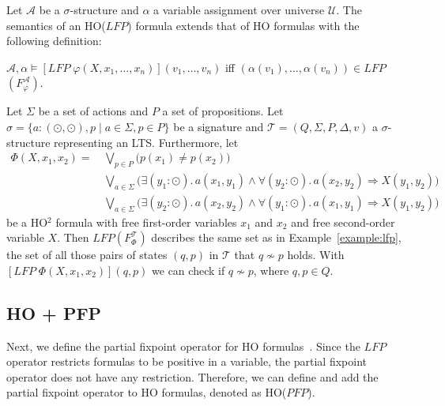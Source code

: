 \begin{definition}
    Let $\mathcal{A}$ be a $\sigma$-structure and $\alpha$ a variable assignment over universe $\mathcal{U}$. The
    semantics of an HO($\mathit{LFP}$) formula extends that of HO formulas with the following definition:
    \begin{compactitem}
        \item $\mathcal{A}, \alpha \models [\mathit{LFP}\;\varphi(X, x_1, \dots, x_n)](v_1, \dots,
        v_n)$ iff $(\alpha(v_1), \dots, \alpha(v_n)) \in \mathit{LFP}$ $(F_\varphi^\mathcal{A})$.
    \end{compactitem}
\end{definition}

\begin{example}
    \label{example:ho_lfp} 
    Let $\Sigma$ be a set of actions and $P$ a set of propositions. Let $\sigma = \{a: (\odot, \odot), p \mid a \in \Sigma, p \in P\}$ be a signature and $\mathcal{T} = (Q, \Sigma, P, \Delta, v)$ a $\sigma$-structure representing an LTS. Furthermore, let 
\begin{align*}
\Phi(X, x_1, x_2) =\, &\underset{p\in P}{\bigvee} \big(p(x_1) \neq p(x_2)\big)\\&
 \underset{a\in\Sigma}{\bigvee} \big(\exists (y_1 \colon \odot).\, a(x_1, y_1) \wedge \forall (y_2 
 \colon \odot).\, a(x_2,y_2) \Rightarrow X(y_1, y_2)\big) \\&
\underset{a\in\Sigma}{\bigvee} \big(\exists (y_2 \colon \odot).\, a(x_2, y_2) \wedge \forall (y_1 
\colon \odot).\, a(x_1,y_1) \Rightarrow X(y_1, y_2)\big)
\end{align*}
be a HO$^2$ formula with free first-order variables $x_1$ and $x_2$ and free second-order variable $X$.
Then $LFP(F_\Phi^\mathcal{T})$ describes the same set as in Example~\ref{example:lfp}, the set of all those pairs of states $(q, p)$ in $\mathcal{T}$ that $q\not\sim p$ holds. With $[LFP\; \Phi(X, x_1, x_2)](q, p)$ we can check if $q \not\sim p$, where $q, p \in Q$. 
\end{example}

\subsection{HO + PFP}\label{subsec:ho+Pfp}

Next, we define the partial fixpoint operator for HO formulas~\cite{schewe2006fixpoint}. Since the
$\mathit{LFP}$ operator restricts formulas to be positive in a variable, the partial fixpoint operator does not have any
restriction. Therefore, we can define and
add the partial fixpoint operator to HO formulas, denoted as HO($\mathit{PFP}$).

